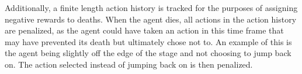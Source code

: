 Additionally, a finite length action history is tracked for the purposes of assigning negative rewards to deaths. When the agent dies, all actions in the action history are penalized, as the agent could have taken an action in this time frame that may have prevented its death but ultimately chose not to. An example of this is the agent being slightly off the edge of the stage and not choosing to jump back on. The action selected instead of jumping back on is then penalized.


